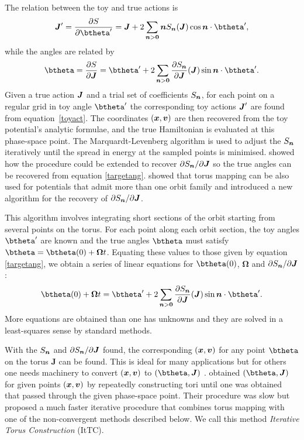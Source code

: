 \documentclass[useAMS,usenatbib,fleqn,a4paper]{mn2e}
\newcommand{\bs}[1]{\bmath{#1}}
\begin{document}
The relation between the toy and true
actions is
\begin{equation}
\bs{J}'=\frac{\partial S}{\partial \btheta'} = \bs{J}+2\sum_{\bs{n}>\bs{0}}\bs{n}S_{\bs{n}}(\bs{J})\cos\bs{n}\cdot\btheta',
\label{toyact}
\end{equation}
while the angles are related by
\begin{equation}
\btheta=\frac{\partial S}{\partial \bs{J}}
= \btheta'+2\sum_{\bs{n}>\bs{0}}\frac{\partial S_{\bs{n}}}{\partial \bs{J}}(\bs{J})\sin\bs{n}\cdot\btheta'.
\label{targetang}
\end{equation}
 Given a true action $\bs{J}$ and a trial set of coefficients
$S_{\bs{n}}$, for each point on a regular grid in toy angle $\btheta'$ the
corresponding toy actions $\bs{J}'$ are found from equation~\eqref{toyact}.
The coordinates $(\bs{x},\bs{v})$ are then recovered from the toy
potential's analytic formulae, and the true Hamiltonian is evaluated at
this phase-space point.  The Marquardt-Levenberg algorithm is used to adjust
the $S_{\bs{n}}$ iteratively until the spread in energy at the sampled points
is minimised. \cite{BinneyKumar} showed how the procedure could be extended
to recover $\partial S_{\bs{n}}/\partial\bs{J}$ so the true angles can be
recovered from equation \eqref{targetang}.  \cite{KaasalainenB} showed that
torus mapping can be also used for potentials that admit more than one orbit
family and introduced a new algorithm for the recovery of $\partial
S_{\bs{n}}/\partial\bs{J}$.

This algorithm involves integrating short sections of the orbit starting from
several points on the torus. For each point along each orbit section, the toy
angles $\btheta'$ are known and the true angles $\btheta$ must satisfy
$\btheta=\btheta(0)+\boldsymbol{\Omega}t$. Equating these values to those
given by equation \eqref{targetang}, we obtain a series of
linear equations for $\btheta(0)$, $\boldsymbol{\Omega}$ and $\partial
S_{\bs{n}}/\partial\bs{J}$:
\begin{equation}
\btheta(0)+\boldsymbol{\Omega}t
= \btheta'+2\sum_{\bs{n}>\bs{0}}\frac{\partial S_{\bs{n}}}{\partial \bs{J}}(\bs{J})\sin\bs{n}\cdot\btheta'.
\label{toyang}
\end{equation}
 More equations are obtained than one has unknowns and they are solved in a
least-squares sense by standard methods.

With the $S_{\bs{n}}$ and $\partial S_{\bs{n}}/\partial \bs{J}$ found, the
corresponding $(\bs{x},\bs{v})$ for any point $\btheta$ on the torus
$\boldsymbol{J}$ can be found. This is ideal for many applications but for
others one needs machinery to convert $(\bs{x},\bs{v})$ to
$(\btheta,\boldsymbol{J})$ \citep[e.g.][]{McMillanBinney2013}.
\cite{McMillanBinney2008} obtained $(\btheta,\boldsymbol{J})$ for given
points $(\bs{x},\bs{v})$ by repeatedly constructing tori until one was
obtained that passed through the given phase-space point. Their procedure was
slow but \cite{SandersBinney2015} proposed a much faster iterative
procedure that combines torus mapping with one of the non-convergent methods
described below. We call this method \emph{Iterative Torus Construction} (ItTC).
\end{document}
